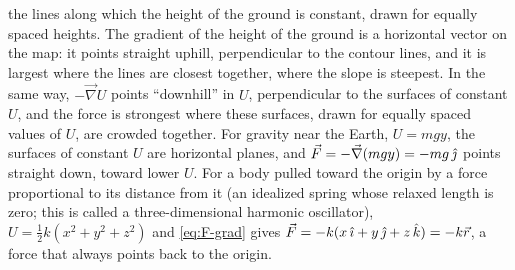 \documentclass[11pt,a4paper]{article}
\begin{document}
the lines along which the height of the ground is constant, drawn for equally spaced heights. The
gradient of the height of the ground is a horizontal vector on the map: it points straight uphill,
perpendicular to the contour lines, and it is largest where the lines are closest together, where
the slope is steepest. In the same way, $-\vec{\nabla} U$ points ``downhill'' in $U$, perpendicular
to the surfaces of constant $U$, and the force is strongest where these surfaces, drawn for equally
spaced values of $U$, are crowded together. For gravity near the Earth, $U = mgy$, the surfaces of
constant $U$ are horizontal planes, and $\vec{F} = -\vec{\nabla}(mgy) = -mg\,\hat{\jmath}$ points straight
down, toward lower $U$. For a body pulled toward the origin by a force proportional to its distance
from it (an idealized spring whose relaxed length is zero; this is called a three-dimensional
harmonic oscillator), $U = \frac12 k(x^2 + y^2 + z^2)$ and \eqref{eq:F-grad} gives
$\vec{F} = -k(x\,\hat{\imath} + y\,\hat{\jmath} + z\,\hat{k}) = -k\vec{r}$, a force that always points back to the
origin.
\end{document}
